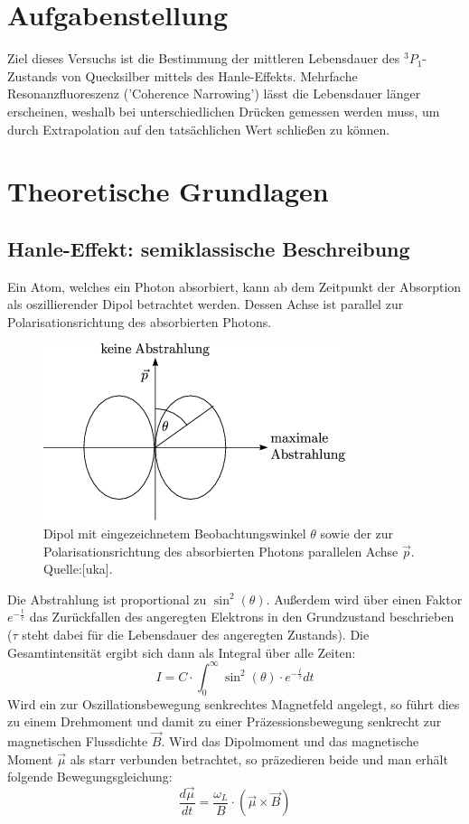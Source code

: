\section{Aufgabenstellung}
Ziel dieses Versuchs ist die Bestimmung der mittleren Lebensdauer des $^{3}P_{1}$-Zustands von Quecksilber mittels des Hanle-Effekts. Mehrfache Resonanzfluoreszenz ('Coherence Narrowing') lässt die Lebensdauer länger erscheinen, weshalb bei unterschiedlichen Drücken gemessen werden muss, um durch Extrapolation auf den tatsächlichen Wert schließen zu können.
\section{Theoretische Grundlagen}
\subsection{Hanle-Effekt: semiklassische Beschreibung}
Ein Atom, welches ein Photon absorbiert, kann ab dem Zeitpunkt der Absorption als oszillierender Dipol betrachtet werden. Dessen Achse ist parallel zur Polarisationsrichtung des absorbierten Photons.
\begin{center}
\begin{figure}[htbp]
\hspace{4.0cm}
\includegraphics{Bilder/dipol}
\caption{Dipol mit eingezeichnetem Beobachtungswinkel $\theta$ sowie der zur Polarisationsrichtung des absorbierten Photons parallelen Achse $\vec{p}$. Quelle:[uka].}
\end{figure}
\end{center}
Die Abstrahlung ist proportional zu $\sin^{2}(\theta)$. Außerdem wird über einen Faktor $e^{-\frac{t}{\tau}}$ das Zurückfallen des angeregten Elektrons in den Grundzustand beschrieben ($\tau$ steht dabei für die Lebensdauer des angeregten Zustands). Die Gesamtintensität ergibt sich dann als Integral über alle Zeiten: \[I=C\cdot\int_{0}^{\infty}\sin^{2}(\theta)\cdot e^{-\frac{t}{\tau}}dt\] 
Wird ein zur Oszillationsbewegung senkrechtes Magnetfeld angelegt, so führt dies zu einem Drehmoment und damit zu einer Präzessionsbewegung senkrecht zur magnetischen Flussdichte $\vec{B}$. Wird das Dipolmoment und das magnetische Moment $\vec{\mu}$ als starr verbunden betrachtet, so präzedieren beide und man erhält folgende Bewegungsgleichung: \[\frac{d\vec{\mu}}{dt}=\frac{\omega_{L}}{B}\cdot(\vec{\mu}\times\vec{B})\]
